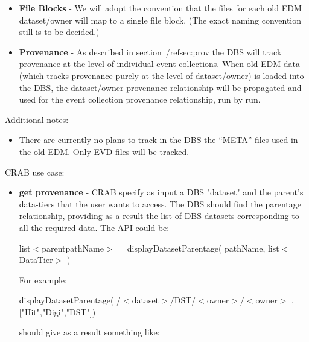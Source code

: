 \documentclass[pdftex]{cmspaper}
\begin{document}
{\begin{itemize}
\begin{center}
   /$<$Dataset$>$/$<$DataTier$>$/$<$Owner$>$/EvC\_Run$<$run-number$>$ 
\end{center}

and these will be the event collection names entered into the DBS. Jobs
will be configured with one or more such event collections. (Note that
this doesn't imply that the same naming convention for event collections
will be used for event collections in the new Framework/EDM. This is just
what works currently with ORCA and the old EDM.)

\item {\bf File Blocks} - We will adopt the convention that the files for each 
                    old 
                    EDM dataset/owner will map to a single file block. (The
                    exact naming convention still is to be decided.)
\item {\bf Provenance} - As described in section~/ref{sec:prov} the DBS
                    will track provenance at the level of individual event
                    collections. When old EDM data (which tracks provenance
                    purely at the level of dataset/owner) is loaded into
                    the DBS, the dataset/owner provenance relationship will
                    be propagated and used for the event collection provenance
                    relationship, run by run.
\end{itemize}

  Additional notes:

\begin{itemize}
\item There are currently no plans to track in the DBS the ``META'' files 
used in the old EDM. Only EVD files will be tracked. 
\end{itemize}

  CRAB use case:
\begin{itemize}
\item {\bf get provenance } - CRAB specify as input a DBS "dataset" and the parent's data-tiers that the user wants to access. The DBS should find the parentage relationship, providing as a result the list of DBS datasets corresponding to all the required data.
The API could be:
\begin{center}
   list$<$parentpathName$>$  = displayDatasetParentage( pathName, list$<$DataTier$>$ ) 

\end{center}

For example:
\begin{center}
   displayDatasetParentage( /$<$dataset$>$/DST/$<$owner$>$/$<$owner$>$ , ["Hit","Digi","DST"])
\end{center}
should give as a result something like:


\end{itemize}}
\end{document}

